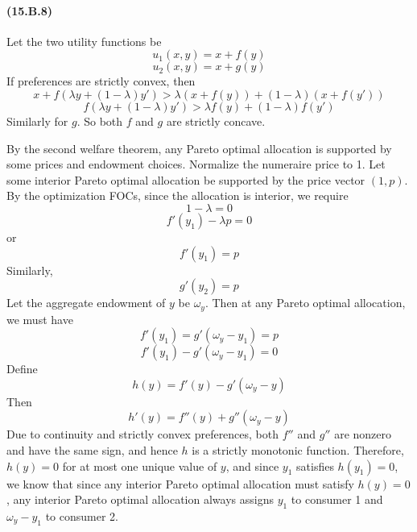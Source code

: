 \documentclass[10pt,letter]{article}
\begin{document}
\paragraph{(15.B.8)} Let the two utility functions be
\[ u_1(x,y) = x + f(y) \]
\[ u_2(x,y) = x + g(y) \]
If preferences are strictly convex, then
\[  x +  f(\lambda y + (1-\lambda)y')  > \lambda (x+f(y)) + (1-\lambda)(x + f(y')) \]
\[ f(\lambda y + (1-\lambda)y')> \lambda f(y) + (1-\lambda) f(y')  \]
Similarly for $g$. So both $f$ and $g$ are strictly concave.

By the second welfare theorem, any Pareto optimal allocation is supported by some prices and endowment choices. Normalize the numeraire price to 1. Let some interior Pareto optimal allocation be supported by the price vector $(1, p)$. By the optimization FOCs, since the allocation is interior, we require
\[ 1 - \lambda = 0 \]
\[ f'(y_1) - \lambda p =0 \]
or
\[ f'(y_1) = p \]
Similarly,
\[ g'(y_2) = p \]
Let the aggregate endowment of $y$ be $\omega_y$. Then at any Pareto optimal allocation, we must have
\[ f'(y_1) = g'(\omega_y - y_1) = p \]
\[ f'(y_1) - g'(\omega_y - y_1) = 0 \]
Define
\[ h(y) = f'(y) - g'(\omega_y - y) \]
Then
\[ h'(y) = f''(y) + g''(\omega_y - y) \]
Due to continuity and strictly convex preferences, both $f''$ and $g''$ are nonzero and have the same sign, and hence $h$ is a strictly monotonic function. Therefore, $h(y) = 0$ for at most one unique value of $y$, and since $y_1$ satisfies $h(y_1) = 0$, we know that since any interior Pareto optimal allocation must satisfy $h(y) = 0$, any interior Pareto optimal allocation always assigns $y_1$ to consumer 1 and $\omega_y - y_1$ to consumer 2.
\end{document}
